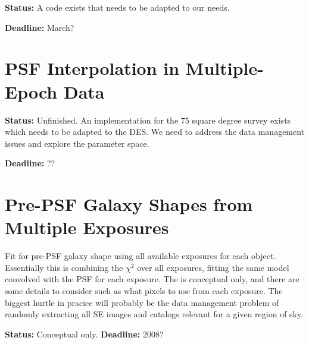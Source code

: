 \documentclass[12pt]{article}
\begin{document}
{\bf Status:}  A code exists that needs to be adapted to our needs.

{\bf Deadline:} March?

\section{PSF Interpolation in Multiple-Epoch Data} \label{sec:meinterp}

{\bf Status:} Unfinished.  An implementation for the 75 square degree survey
exists which needs to be adapted to the DES.  We need to address the data
management issues and explore the parameter space.

{\bf Deadline:} ??

\section{Pre-PSF Galaxy Shapes from Multiple Exposures} \label{sec:mdeconv}

Fit for pre-PSF galaxy shape using all available exposures for each object.
Essentially this is combining the $\chi^2$ over all exposures, fitting the same
model convolved with the PSF for each exposure.  The is conceptual only, and
there are some details to consider such as what pixels to use from each
exposure.  The biggest hurtle in pracice will probably be the data management
problem of randomly extracting all SE images and catalogs relevant for a given 
region of sky.

{\bf Status:} Conceptual only.
{\bf Deadline:} 2008?
\end{document}
